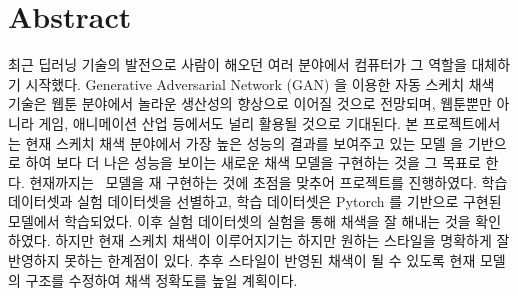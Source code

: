 \section{Abstract}

최근 딥러닝 기술의 발전으로 사람이 해오던 여러 분야에서 컴퓨터가 그 역할을 대체하기 시작했다. Generative Adversarial Network (GAN) \cite{Goodfellow2014}을 이용한 자동 스케치 채색 기술은 웹툰 분야에서 놀라운 생산성의 향상으로 이어질 것으로 전망되며, 웹툰뿐만 아니라 게임, 애니메이션 산업 등에서도 널리 활용될 것으로 기대된다. 본 프로젝트에서는 현재 스케치 채색 분야에서 가장 높은 성능의 결과를 보여주고 있는 \stylepaint 모델 \cite{Zhang2017}을 기반으로 하여 \autopaint \cite{Liu2018AutoPainter}보다 더 나은 성능을 보이는 새로운 채색 모델을 구현하는 것을 그 목표로 한다. 현재까지는 \stylepaint~모델을 재 구현하는 것에 초점을 맞추어 프로젝트를 진행하였다. 
학습 데이터셋과 실험 데이터셋을 선별하고, 학습 데이터셋은 Pytorch \cite{pytorch}를 기반으로 구현된 모델에서 학습되었다. 이후 실험 데이터셋의 실험을 통해 채색을 잘 해내는 것을 확인하였다.
하지만 현재 스케치 채색이 이루어지기는 하지만 원하는 스타일을 명확하게 잘 반영하지 못하는 한계점이 있다. 추후 스타일이 반영된 채색이 될 수 있도록 현재 모델의 구조를 수정하여 채색 정확도를 높일 계획이다.	